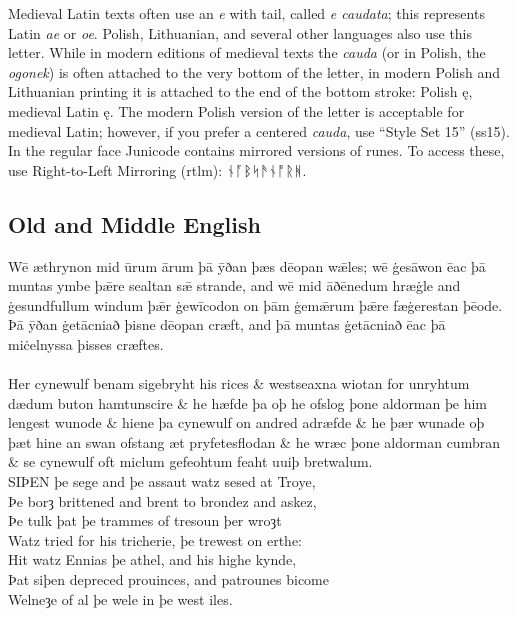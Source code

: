 \documentclass[a4paper]{article}
\begin{document}
 Medieval Latin texts often use an
          {\itshape e} with tail, called {\itshape e caudata}; this
          represents Latin {\itshape ae} or {\itshape oe}. Polish,
          Lithuanian, and several other languages also use this
          letter. While in modern editions of medieval texts the
          {\itshape cauda} (or in Polish, the {\itshape ogonek}) is
          often attached to the very bottom of the letter, in modern
          Polish and Lithuanian printing it is attached to the end of
          the bottom stroke: Polish ę, medieval Latin
          {ę}. The modern Polish
          version of the letter is acceptable for medieval Latin;
          however, if you prefer a centered {\itshape cauda}, use
          “Style Set 15” (ss15).\\

 In the regular face Junicode
contains mirrored versions of runes. To access these, use
Right-to-Left Mirroring (rtlm): { ᚾᚪᛒᛋᚫᚾᚩᚱᚻ.}

\pagebreak
\subsection*{Old and Middle English}

Wē æthrynon mid ūrum ārum þā ȳðan þæs dēopan wǣles; wē
ġesāwon ēac þā muntas ymbe þǣre sealtan sǣ strande, and wē mid
āðēnedum hræġle and ġesundfullum windum þǣr ġewīcodon on þām
ġemǣrum þǣre fæġerestan þēode. Þā ȳðan ġetācniað þisne dēopan
cræft, and þā muntas ġetācniað ēac þā miċelnyssa þisses cræftes.\\


\\[1ex]
Her cynewulf benam sigebryht his rices \& westseaxna wiotan for
un\-ryht\-um dædum buton hamtunscire \& he hæfde þa oþ he ofslog
þone aldorman þe him lengest wunode \& hiene þa cynewulf on
andred adræfde \& he þær wunade oþ þæt hine an swan ofstang
æt pryfetesflodan \& he wræc þone aldorman cumbran \& se cynewulf
oft miclum gefeohtum feaht uuiþ bretwalum.\\

\noindent SIÞEN þe sege and þe assaut watz sesed at Troye,\\
Þe borȝ brittened and brent to brondez and askez,\\
Þe tulk þat þe trammes of tresoun þer wroȝt\\
Watz tried for his tricherie, þe trewest on erthe:\\
Hit watz Ennias þe athel, and his highe kynde,\\
Þat siþen depreced prouinces, and patrounes bicome\\
Welneȝe of al þe wele in þe west iles.
\end{document}
